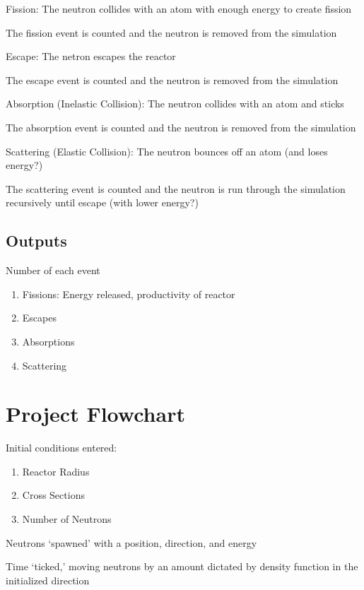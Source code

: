 \documentclass{notes}
\begin{document}
Fission: The neutron collides with an atom with enough energy to create fission

\tab \indicates The fission event is counted and the neutron is removed from the simulation

Escape: The netron escapes the reactor

\tab \indicates The escape event is counted and the neutron is removed from the simulation

Absorption (Inelastic Collision): The neutron collides with an atom and sticks

\tab \indicates The absorption event is counted and the neutron is removed from the simulation

Scattering (Elastic Collision): The neutron bounces off an atom (and loses energy?)

\tab \indicates The scattering event is counted and the neutron is run through the simulation recursively until escape (with lower energy?)

\subsection{Outputs}

Number of each event

\begin{enumerate}
    \item Fissions: Energy released, productivity of reactor
    \item Escapes
    \item Absorptions
    \item Scattering
\end{enumerate}

\section{Project Flowchart}

Initial conditions entered:

\begin{enumerate}
    \item Reactor Radius
    \item Cross Sections
    \item Number of Neutrons
\end{enumerate}

Neutrons `spawned' with a position, direction, and energy

Time `ticked,' moving neutrons by an amount dictated by density function in the initialized direction
\end{document}
